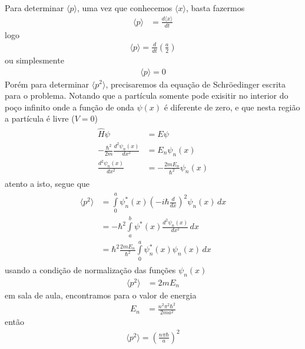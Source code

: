 \begin{prob}
\begin{sol}
		Para determinar $\langle p \rangle$, uma vez que conhecemos $\langle x \rangle$, basta fazermos 
		\begin{align}
			\langle p \rangle &= \frac{d \langle x \rangle}{dt}
		\end{align}
		logo
		\begin{align}
			\langle p \rangle =\frac{d}{dt}\left(\frac{a}{2}\right)
		\end{align}
		ou simplesmente
		\begin{align}
			\boxed{\langle p \rangle=0}
		\end{align}
		Porém para determinar $\langle p^{2} \rangle$, precisaremos da equação de Schröedinger escrita para o problema. Notando que a partícula somente pode exisitir no interior do poço infinito onde a função de onda $\psi(x)$ é diferente de zero, e que nesta região a partícula é livre ($V=0$)
		\begin{align}
			\begin{split}
				\hat{H} \psi &= E\psi\\
				-\frac{\hbar^{2}}{2m}\frac{d^{2}\psi_{n}(x)}{dx^{2}} &= E_{n} \psi_{n}(x)\\
				\frac{d^{2} \psi_{n}(x)}{dx^{2}} &= -\frac{2mE_{n}}{\hbar^{2}} \psi_{n}(x)
			\end{split}
		\end{align}
		atento a isto, segue que
		\begin{align}
			\begin{split}
				\langle p^{2} \rangle &= \int\limits_{0}^{a} \psi_{n}^{*}(x)\left(-i \hbar \frac{d}{dx}\right)^{2} \psi_{n}(x)\,d{x}\\
															&= -\hbar^{2}\int\limits_{a}^{b} \psi^{*}(x)\frac{d^{2} \psi_{n}(x)}{dx^{2}}\,d{x}\\
															&= \hbar^{2}\frac{2mE_{n}}{\hbar^{2}}\int\limits_{0}^{a} \psi_{n}^{*}(x) \psi_{n}(x)\,d{x}
			\end{split}
		\end{align}
		usando a condição de normalização das funções $\psi_{n}(x)$
		\begin{align}
			\langle p^{2} \rangle	&= 2mE_{n}
		\end{align}
		em sala de aula, encontramos para o valor de energia
		\begin{align}
			E_{n} &= \frac{n^{2} \pi^{2} \hbar^{2}}{2ma^{2}}
		\end{align}
		então
		\begin{align}
			\boxed{
				\langle p^{2} \rangle = \left(\frac{n \pi \hbar}{a}\right)^{2}
			}
		\end{align}


\end{sol}
\end{prob}
